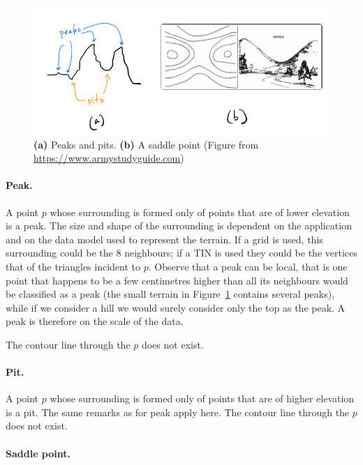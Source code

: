 \begin{figure}
  \centering
  \includegraphics[width=\linewidth]{figs/feature_points}
  \caption{\textbf{(a)} Peaks and pits. \textbf{(b)} A saddle point (Figure from \url{https://www.armystudyguide.com})}%
\label{fig:feature_points}
\end{figure}


\paragraph{Peak.}
A point $p$ whose surrounding is formed only of points that are of lower elevation is a peak.
The size and shape of the surrounding is dependent on the application and on the data model used to represent the terrain.
If a grid is used, this surrounding could be the 8 neighbours; if a TIN is used they could be the vertices that of the triangles incident to $p$.
Observe that a peak can be local,%
that is one point that happens to be a few centimetres higher than all its neighbours would be classified as a peak (the small terrain in Figure~\ref{fig:feature_points} contains several peaks), while if we consider a hill we would surely consider only the top as the peak.
A peak is therefore on the scale of the data.

The contour line through the $p$ does not exist.

\paragraph{Pit.}
A point $p$ whose surrounding is formed only of points that are of higher elevation is a pit.
The same remarks as for peak apply here.
The contour line through the $p$ does not exist.

\paragraph{Saddle point.}%

